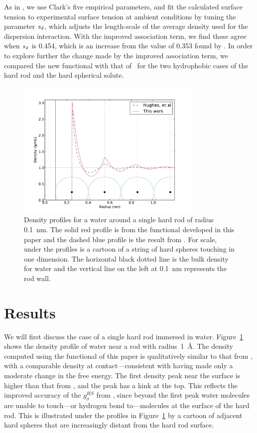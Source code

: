 As in \hughesetal, we use Clark's five empirical parameters, and fit
the calculated surface tension to experimental surface tension at
ambient conditions by tuning the parameter $s_d$, which adjusts
the length-scale of the average density used for the dispersion
interaction.  With the improved association term, we find these agree
when $s_d$ is 0.454, which is an increase from the value of 0.353
found by \hughesetal.  In order to explore further the change made by
the improved association term, we compared the new functional with
that of \hughesetal\ for the two hydrophobic cases of the hard rod and
the hard spherical solute.

\begin{figure}
\begin{center}
\includegraphics[width=3.5in]{figs/density-compare}
\end{center}
\caption{ Density profiles for a water around a single hard rod
  of radius 0.1~nm. The solid red profile is from the functional
  developed in this paper and the dashed blue profile is the result
  from \hughesetal.  For scale, under the profiles
  is a cartoon of a string of hard spheres touching in one
  dimension. The horizontal black dotted line is the bulk density for
  water and the vertical line on the left at 0.1~nm represents the
  rod wall.}
\label{fig:density-single-rod}
\end{figure}

\section{Results}

We will first discuss the case of a single hard rod immersed in
water. Figure~\ref{fig:density-single-rod} shows the density profile
of water near a rod with radius~1~\AA.  The density computed using the
functional of this paper is qualitatively similar to that from
\hughesetal, with a comparable density at contact---consistent with
having made only a moderate change in the free energy.  The first
density peak near the surface is higher than that from \hughesetal,
and the peak has a kink at the top.  This reflects the improved
accuracy of the $g_\sigma^\textit{HS}$ from \hughesetal, since beyond
the first peak water molecules are unable to touch---or hydrogen bond
to---molecules at the surface of the hard rod. This is illustrated
under the profiles in Figure~\ref{fig:density-single-rod} by a cartoon
of adjacent hard spheres that are increasingly distant from the hard
rod surface.


